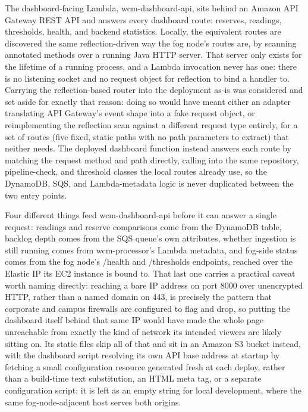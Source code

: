 \documentclass[conference,a4paper]{IEEEtran}
\begin{document}
The dashboard-facing Lambda, wcm-dashboard-api, sits behind an Amazon API Gateway REST API and answers every dashboard route: reserves, readings, thresholds, health, and backend statistics. Locally, the equivalent routes are discovered the same reflection-driven way the fog node's routes are, by scanning annotated methods over a running Java HTTP server. That server only exists for the lifetime of a running process, and a Lambda invocation never has one: there is no listening socket and no request object for reflection to bind a handler to. Carrying the reflection-based router into the deployment as-is was considered and set aside for exactly that reason: doing so would have meant either an adapter translating API Gateway's event shape into a fake request object, or reimplementing the reflection scan against a different request type entirely, for a set of routes (five fixed, static paths with no path parameters to extract) that neither needs. The deployed dashboard function instead answers each route by matching the request method and path directly, calling into the same repository, pipeline-check, and threshold classes the local routes already use, so the DynamoDB, SQS, and Lambda-metadata logic is never duplicated between the two entry points.

Four different things feed wcm-dashboard-api before it can answer a single request: readings and reserve comparisons come from the DynamoDB table, backlog depth comes from the SQS queue's own attributes, whether ingestion is still running comes from wcm-processor's Lambda metadata, and fog-side status comes from the fog node's /health and /thresholds endpoints, reached over the Elastic IP its EC2 instance is bound to. That last one carries a practical caveat worth naming directly: reaching a bare IP address on port 8000 over unencrypted HTTP, rather than a named domain on 443, is precisely the pattern that corporate and campus firewalls are configured to flag and drop, so putting the dashboard itself behind that same IP would have made the whole page unreachable from exactly the kind of network its intended viewers are likely sitting on. Its static files skip all of that and sit in an Amazon S3 bucket instead, with the dashboard script resolving its own API base address at startup by fetching a small configuration resource generated fresh at each deploy, rather than a build-time text substitution, an HTML meta tag, or a separate configuration script; it is left as an empty string for local development, where the same fog-node-adjacent host serves both origins.
\end{document}
